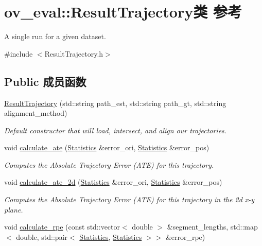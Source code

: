 \hypertarget{classov__eval_1_1ResultTrajectory}{}\section{ov\+\_\+eval\+:\+:Result\+Trajectory类 参考}
\label{classov__eval_1_1ResultTrajectory}


A single run for a given dataset.  




{\ttfamily \#include $<$Result\+Trajectory.\+h$>$}

\subsection*{Public 成员函数}
\begin{DoxyCompactItemize}
\item 
\hyperlink{classov__eval_1_1ResultTrajectory_a91d8d079db9f290d384746b7a030e336}{Result\+Trajectory} (std\+::string path\+\_\+est, std\+::string path\+\_\+gt, std\+::string alignment\+\_\+method)
\begin{DoxyCompactList}\small\item\em Default constructor that will load, intersect, and align our trajectories. \end{DoxyCompactList}\item 
void \hyperlink{classov__eval_1_1ResultTrajectory_aa82df799f7eb6ccc6f7665cd7a383c40}{calculate\+\_\+ate} (\hyperlink{structov__eval_1_1Statistics}{Statistics} \&error\+\_\+ori, \hyperlink{structov__eval_1_1Statistics}{Statistics} \&error\+\_\+pos)
\begin{DoxyCompactList}\small\item\em Computes the Absolute Trajectory Error (A\+TE) for this trajectory. \end{DoxyCompactList}\item 
void \hyperlink{classov__eval_1_1ResultTrajectory_aea298386d6615b31a75e9578baf77497}{calculate\+\_\+ate\+\_\+2d} (\hyperlink{structov__eval_1_1Statistics}{Statistics} \&error\+\_\+ori, \hyperlink{structov__eval_1_1Statistics}{Statistics} \&error\+\_\+pos)
\begin{DoxyCompactList}\small\item\em Computes the Absolute Trajectory Error (A\+TE) for this trajectory in the 2d x-\/y plane. \end{DoxyCompactList}\item 
void \hyperlink{classov__eval_1_1ResultTrajectory_abf4d8b00abdf68692ceaa85b5c1c5b0f}{calculate\+\_\+rpe} (const std\+::vector$<$ double $>$ \&segment\+\_\+lengths, std\+::map$<$ double, std\+::pair$<$ \hyperlink{structov__eval_1_1Statistics}{Statistics}, \hyperlink{structov__eval_1_1Statistics}{Statistics} $>$$>$ \&error\+\_\+rpe)
$$
\end{DoxyCompactItemize}

